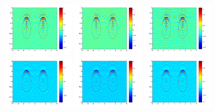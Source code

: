 \documentclass[12pt]{iopart}
\begin{document}
{\begin{figure}
	\centering
	\includegraphics[width=0.32\textwidth]{./graphic/bi_circle_4pi_error2-eps-converted-to.pdf}
	\includegraphics[width=0.32\textwidth]{./graphic/bi_circle_4pi_error4-eps-converted-to.pdf}
	\includegraphics[width=0.32\textwidth]{./graphic/bi_circle_4pi_error6-eps-converted-to.pdf}
	\includegraphics[width=0.32\textwidth]{./graphic/bi_circle_multi_2_8_error2-eps-converted-to.pdf}
	\includegraphics[width=0.32\textwidth]{./graphic/bi_circle_multi_2_8_error4-eps-converted-to.pdf}
	\includegraphics[width=0.32\textwidth]{./graphic/bi_circle_multi_2_8_error6-eps-converted-to.pdf}
	

\end{figure}}
\end{document}
